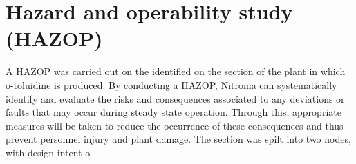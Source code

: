 \section{Hazard and operability study (HAZOP) }
 
A HAZOP was carried out on the identified on the section of the plant in which o-toluidine is produced. By conducting a HAZOP, Nitroma can systematically identify and evaluate the risks and consequences associated to any deviations or faults that may occur during steady state operation. Through this, appropriate measures will be taken to reduce the occurrence of these consequences and thus prevent personnel injury and plant damage. The section was spilt into two nodes, with design intent o
 


\begin{table}[]
\centering
\caption{The design intent of nodes from HAZOP study}
\label{tab:nodes}
\end{table}
